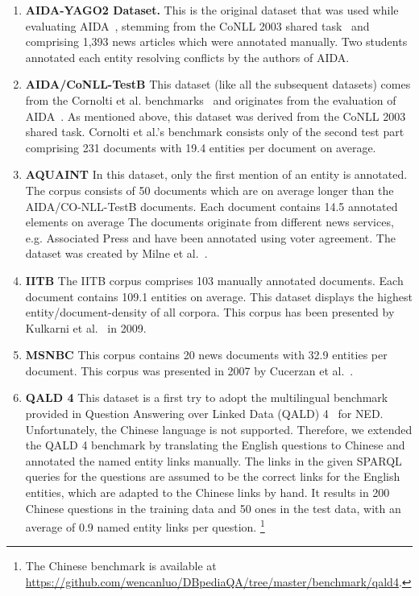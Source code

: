 \begin{enumerate}
\item \textbf{AIDA-YAGO2 Dataset.}
This is the original dataset that was used while evaluating AIDA~\cite{AIDA}, stemming from the CoNLL 2003 shared task~\cite{conll2003} and comprising 1,393 news articles which were annotated manually. %
Two students annotated each entity resolving conflicts by the authors of AIDA. 

\item  \textbf{AIDA/CoNLL-TestB} This dataset (like all the subsequent datasets) comes from the Cornolti et al. benchmarks~\cite{cornolti} and originates from the evaluation of AIDA~\cite{AIDA}. 
As mentioned above, this dataset was derived from the CoNLL 2003 shared task. %
Cornolti et al.'s benchmark consists only of the second test part comprising 231 documents with 19.4 entities per document on average.

\item \textbf{AQUAINT} In this dataset, only the first mention of an entity is annotated. The corpus consists of 50 documents which are on average longer than the AIDA/CO-NLL-TestB documents. Each document contains 14.5 annotated elements on average
The documents originate from different news services, e.g. Associated Press and have been annotated using voter agreement.
The dataset was created by Milne et al.~\cite{milne2008learning}.

\item \textbf{IITB} The IITB corpus comprises 103 manually annotated documents. Each document contains 109.1 entities on average.
This dataset displays the highest entity/document-density of all corpora.
This corpus has been presented by Kulkarni et al.~\cite{kulkarni2009collective} in 2009.

\item \textbf{MSNBC} This corpus contains 20 news documents with 32.9 entities per document. This corpus was presented in 2007 by Cucerzan et al.~\cite{Cucerzan07}.

\item \textbf{QALD 4} This dataset is a first try to adopt the multilingual benchmark provided in Question Answering over Linked Data (QALD) 4~\cite{qald4} for \ac{NED}. Unfortunately, the Chinese language is not supported. Therefore, we extended the QALD 4 benchmark by translating the English questions to Chinese and annotated the named entity links manually. The links in the given SPARQL queries for the questions are assumed to be the correct links for the English entities, which are adapted to the Chinese links by hand. It results in 200 Chinese questions in the training data and 50 ones in the test data, with an average of 0.9 named entity links per question. \footnote{The Chinese benchmark is available at \url{https://github.com/wencanluo/DBpediaQA/tree/master/benchmark/qald4}.}

\end{enumerate}

